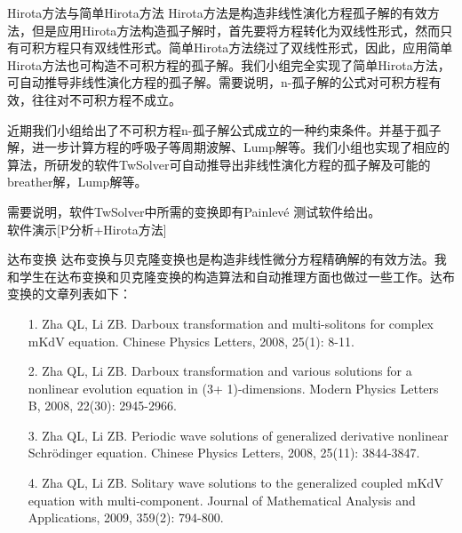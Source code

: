 \documentclass{beamer}
\begin{document}
\begin{frame}{Hirota方法与简单Hirota方法}
Hirota方法是构造非线性演化方程孤子解的有效方法，但是应用Hirota方法构造孤子解时，首先要将方程转化为双线性形式，然而只有可积方程只有双线性形式。简单Hirota方法绕过了双线性形式，因此，应用简单Hirota方法也可构造不可积方程的孤子解。我们小组完全实现了简单Hirota方法，可自动推导非线性演化方程的孤子解。需要说明，n-孤子解的公式对可积方程有效，往往对不可积方程不成立。

近期我们小组给出了不可积方程n-孤子解公式成立的一种约束条件。并基于孤子解，进一步计算方程的呼吸子等周期波解、Lump解等。我们小组也实现了相应的算法，所研发的软件TwSolver可自动推导出非线性演化方程的孤子解及可能的breather解，Lump解等。

需要说明，软件TwSolver中所需的变换即有Painlev\'e 测试软件给出。\\[2mm]

\mbox{}\hskip 3cm 软件演示[P分析+Hirota方法]
  
\end{frame}
\begin{frame}{达布变换}
  达布变换与贝克隆变换也是构造非线性微分方程精确解的有效方法。我和学生在达布变换和贝克隆变换的构造算法和自动推理方面也做过一些工作。达布变换的文章列表如下：
\begin{itemize}
  \item[1.] Zha QL, Li ZB. Darboux transformation and multi-solitons for complex mKdV equation. Chinese Physics Letters, 2008, 25(1): 8-11.
  \item[2.]	Zha QL, Li ZB. Darboux transformation and various solutions for a nonlinear evolution equation in (3+ 1)-dimensions. Modern Physics Letters B, 2008, 22(30): 2945-2966.
  \item[3.]	Zha QL, Li ZB. Periodic wave solutions of generalized derivative nonlinear Schrödinger equation. Chinese Physics Letters, 2008, 25(11): 3844-3847.
  \item[4.] Zha QL, Li ZB. Solitary wave solutions to the generalized coupled mKdV equation with multi-component. Journal of Mathematical Analysis and Applications, 2009, 359(2): 794-800.
\end{itemize}
\end{frame}
\end{document}
